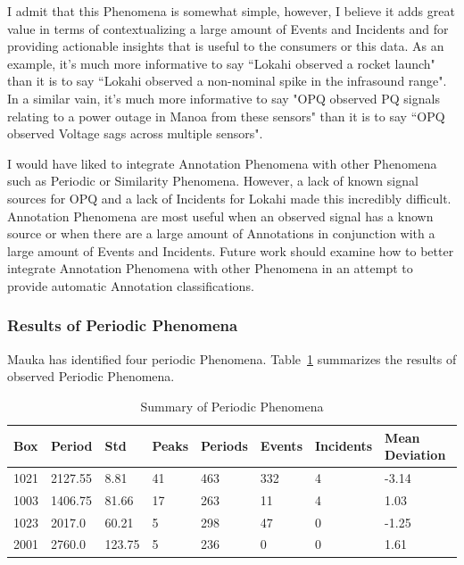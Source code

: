 I admit that this Phenomena is somewhat simple, however, I believe it adds great value in terms of contextualizing a large amount of Events and Incidents and for providing actionable insights that is useful to the consumers or this data. As an example, it's much more informative to say ``Lokahi observed a rocket launch" than it is to say ``Lokahi observed a non-nominal spike in the infrasound range". In a similar vain, it's much more informative to say "OPQ observed PQ signals relating to a power outage in Manoa from these sensors" than it is to say ``OPQ observed Voltage sags across multiple sensors".

I would have liked to integrate Annotation Phenomena with other Phenomena such as Periodic or Similarity Phenomena. However, a lack of known signal sources for OPQ and a lack of Incidents for Lokahi made this incredibly difficult. Annotation Phenomena are most useful when an observed signal has a known source or when there are a large amount of Annotations in conjunction with a large amount of Events and Incidents. Future work should examine how to better integrate Annotation Phenomena with other Phenomena in an attempt to provide automatic Annotation classifications.

\subsubsection{Results of Periodic Phenomena}

Mauka has identified four periodic Phenomena. Table~\ref{table:periodic_summary} summarizes the results of observed Periodic Phenomena.

\begin{table}[H]
    \centering
    \caption{Summary of Periodic Phenomena}
    \begin{tabularx}{\textwidth}{Xlllllll}
        \toprule
        \textbf{Box} & \textbf{Period} & \textbf{Std} & \textbf{Peaks} & \textbf{Periods} & \textbf{Events} & \textbf{Incidents} & \textbf{Mean Deviation} \\
        \midrule
        1021 & 2127.55 & 8.81 & 41 & 463 & 332 & 4 & -3.14 \\
        1003 & 1406.75 & 81.66 & 17 & 263 & 11 & 4 & 1.03 \\
        1023 & 2017.0 & 60.21 & 5 & 298 & 47 & 0 & -1.25 \\
        2001 & 2760.0 & 123.75 & 5 & 236 & 0 & 0 & 1.61 \\
        \bottomrule
    \end{tabularx}
    \label{table:periodic_summary}
\end{table}

